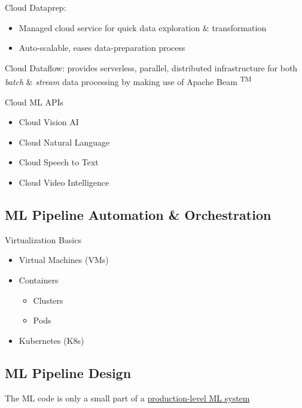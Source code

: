 \documentclass[10pt,landscape,letterpaper]{cheatsheet}
\begin{document}
\begin{multicols}{3}
Cloud Dataprep: 

\begin{itemize}
    \item Managed cloud service for quick data exploration \& transformation
    \item Auto-scalable, eases data-preparation process
\end{itemize}

Cloud Dataflow: provides serverless, parallel, distributed infrastructure for both \emph{batch} \& \emph{stream} data processing by making use of Apache Beam \textsuperscript{TM}

Cloud ML APIs

\begin{itemize}
    \item Cloud Vision AI
    \item Cloud Natural Language
    \item Cloud Speech to Text
    \item Cloud Video Intelligence
\end{itemize}

\subsection{ML Pipeline Automation \& Orchestration}

Virtualization Basics

\begin{itemize}
    \item Virtual Machines (VMs)
    \item Containers
    \begin{itemize}
        \item Clusters
        \item Pods
    \end{itemize}
    \item Kubernetes (K8s)
\end{itemize}

\subsection{ML Pipeline Design}

The ML code is only a small part of a \href{https://cloud.google.com/products/operations}{production-level ML system}


\end{multicols}
\end{document}

